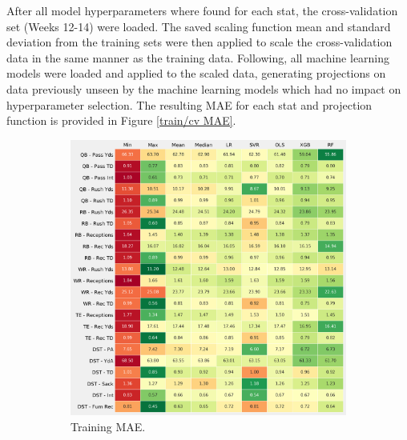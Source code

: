 \documentclass[12pt]{article}
\begin{document}
After all model hyperparameters where found for each stat, the cross-validation set (Weeks 12-14) were loaded. The saved scaling function mean and standard deviation from the training sets were then applied to scale the cross-validation data in the same manner as the training data. Following, all machine learning models were loaded and applied to the scaled data, generating projections on data previously unseen by the machine learning models which had no impact on hyperparameter selection. The resulting MAE for each stat and projection function is provided in Figure \ref{train/cv MAE}.

\begin{figure}[H]
  \centering
  \begin{subfigure}[b]{0.490\textwidth}
    \centering
    \includegraphics[width=1\textwidth]{../figures/essential_train_MAE_table}
    \caption{Training MAE.}
  \end{subfigure}
  \hfill
  \begin{subfigure}[b]{0.490\textwidth}
    \centering

\end{subfigure}
\end{figure}
\end{document}
